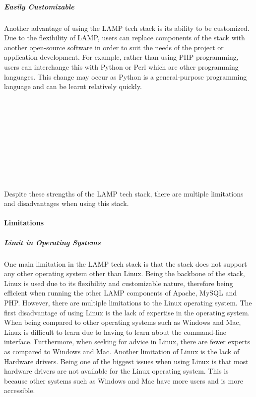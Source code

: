 \documentclass[a4paper, 11pt]{report}
\begin{document}
	\subparagraph{Easily Customizable}
	\noindent
	Another advantage of using the LAMP tech stack is its ability to be customized. Due to the flexibility of LAMP, users can replace components of the stack with another open-source software in order to suit the needs of the project or application development. For example, rather than using PHP programming, users can interchange this with Python or Perl which are other programming languages. This change may occur as Python is a general-purpose programming language and can be learnt relatively quickly. 
	\\
	\\
	\\
	\\
	\\
	\\
	\\
	\\
	\\
	\\
	\\
	Despite these strengths of the LAMP tech stack, there are multiple limitations and disadvantages when using this stack.
	\paragraph{Limitations}
	
	\subparagraph{Limit in Operating Systems}
	\noindent
	One main limitation in the LAMP tech stack is that the stack does not support any other operating system other than Linux. Being the backbone of the stack, Linux is used due to its flexibility and customizable nature, therefore being efficient when running the other LAMP components of Apache, MySQL and PHP. However, there are multiple limitations to the Linux operating system. The first disadvantage of using Linux is the lack of expertise in the operating system. When being compared to other operating systems such as Windows and Mac, Linux is difficult to learn due to having to learn about the command-line interface. Furthermore, when seeking for advice in Linux, there are fewer experts as compared to Windows and Mac. Another limitation of Linux is the lack of Hardware drivers. Being one of the biggest issues when using Linux is that most hardware drivers are not available for the Linux operating system. This is because other systems such as Windows and Mac have more users and is more accessible. 
	
\end{document}
